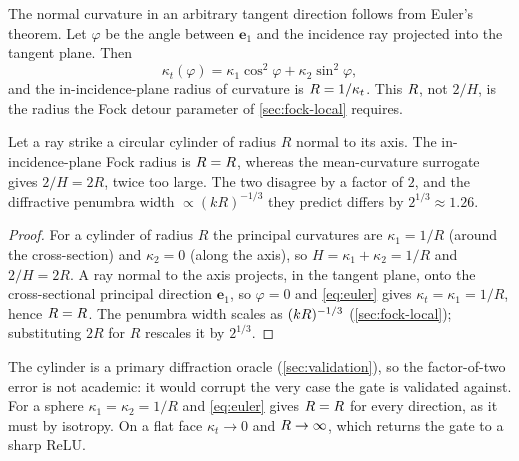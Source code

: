 The normal curvature in an arbitrary tangent direction follows from Euler's
theorem. Let $\varphi$ be the angle between $\bm{e}_1$ and the incidence ray
projected into the tangent plane. Then
\begin{equation}\label{eq:euler}
  \kappa_t(\varphi) = \kappa_1\cos^2\varphi + \kappa_2\sin^2\varphi,
\end{equation}
and the in-incidence-plane radius of curvature is $R = 1/\kappa_t$. This
$R$, not $2/H$, is the radius the Fock detour parameter of
\cref{sec:fock-local} requires.

\begin{proposition}\label{prop:fock-radius}
Let a ray strike a circular cylinder of radius $R$ normal to its axis. The
in-incidence-plane Fock radius is $R = R$, whereas the mean-curvature
surrogate gives $2/H = 2R$, twice too large. The two disagree by a factor of $2$,
and the diffractive penumbra width $\propto(kR)^{-1/3}$ they predict differs by
$2^{1/3}\approx 1.26$.
\end{proposition}

\begin{proof}
For a cylinder of radius $R$ the principal curvatures are $\kappa_1=1/R$ (around
the cross-section) and $\kappa_2=0$ (along the axis), so $H=\kappa_1+\kappa_2=1/R$
and $2/H=2R$. A ray normal to the axis projects, in the tangent plane, onto the
cross-sectional principal direction $\bm{e}_1$, so $\varphi=0$ and
\cref{eq:euler} gives $\kappa_t=\kappa_1=1/R$, hence $R=R$. The penumbra
width scales as $(kR)^{-1/3}$ (\cref{sec:fock-local}); substituting $2R$ for
$R$ rescales it by $2^{1/3}$.
\end{proof}

The cylinder is a primary diffraction oracle (\cref{sec:validation}), so the
factor-of-two error is not academic: it would corrupt the very case the gate is
validated against. For a sphere $\kappa_1=\kappa_2=1/R$ and \cref{eq:euler} gives
$R=R$ for every direction, as it must by isotropy. On a flat face
$\kappa_t\to 0$ and $R\to\infty$, which returns the gate to a sharp ReLU.
